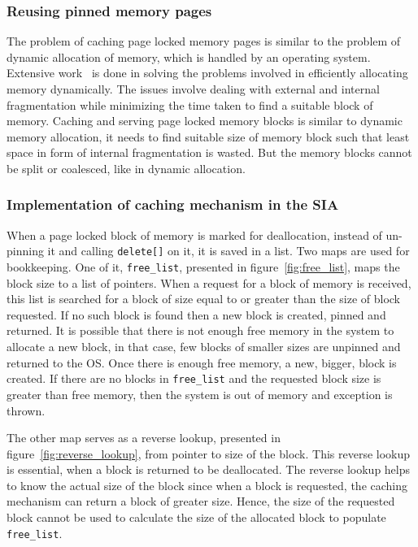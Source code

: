 \subsubsection{Reusing pinned memory pages}
The problem of caching page locked memory pages is similar to the problem of dynamic
allocation of memory, which is handled by an operating system. Extensive work~\cite{Wilson1995}
is done in solving the problems involved in efficiently allocating memory dynamically.
The issues involve dealing with external and internal fragmentation while minimizing
the time taken to find a suitable block of memory. Caching and serving page locked memory blocks
is similar to dynamic memory allocation, it needs to find suitable size of
memory block such that least space in form of internal fragmentation is wasted.
But the memory blocks cannot be split or coalesced, like in dynamic allocation.

\subsubsection{Implementation of caching mechanism in the SIA}\label{sec:cachingmech}
When a page locked block of memory is marked for deallocation, instead of un-pinning it and calling
\texttt{delete[]} on it, it is saved in a list. Two maps are used for bookkeeping.
One of it, \texttt{free\_list}, presented in figure~\ref{fig:free_list},
maps the block size to a list of pointers. When a request for
a block of memory is received, this list is searched for a block of size equal to or
greater than the size of block requested. If no such block is found then a new block
is created, pinned and returned. It is possible that there is not enough free
memory in the system to allocate a new block, in that case, few blocks of smaller
sizes are unpinned and returned to the OS. Once there is enough free memory, a new,
bigger, block is created. If there
are no blocks in \texttt{free\_list} and the requested block size is greater than free memory,
then the system is out of memory and exception is thrown.

The other map serves as a reverse lookup, presented in figure~\ref{fig:reverse_lookup},
from pointer to size of the block. This reverse lookup is essential, when a block is
returned to be deallocated. The reverse lookup helps to know the actual size of the block
since when a block is requested, the caching mechanism can return a block of greater
size.  Hence, the size of the requested block cannot be used to calculate the size
of the allocated block to populate \texttt{free\_list}.

